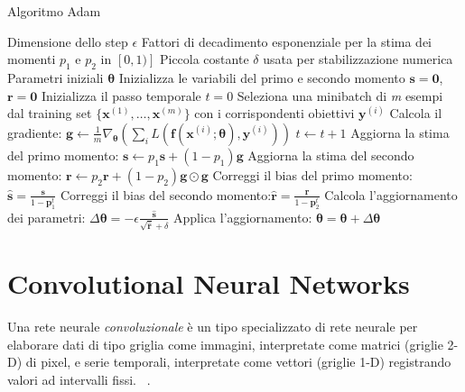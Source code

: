 \documentclass[12pt,a4paper]{report}
\begin{document}
    \begin{algorithm}[t]
        \caption{Algoritmo Adam}
        \begin{algorithmic} \label{alg:adam}
        \REQUIRE Dimensione dello step $\epsilon$
        \REQUIRE Fattori di decadimento esponenziale per la stima dei 
            momenti $p_1$ e $p_2$ in $[0,1)]$
        \REQUIRE Piccola costante $\delta$ usata per stabilizzazione 
            numerica
        \REQUIRE Parametri iniziali $\boldsymbol{\theta}$
        \STATE Inizializza le variabili del primo e secondo momento 
            $\boldsymbol{s}=\boldsymbol{0}$, 
            $\boldsymbol{r}=\boldsymbol{0}$
        \STATE Inizializza il passo temporale $t=0$
        \STATE Seleziona una minibatch di \textit{m} esempi dal training
            set $\{\boldsymbol{x}^{(1)}, \dots, \boldsymbol{x}^{(m)}\}$ 
            con i corrispondenti obiettivi $\boldsymbol{y}^{(i)}$
        \STATE Calcola il gradiente: $\boldsymbol{g}\leftarrow 
            \frac{1}{m}\nabla_{\boldsymbol{\theta}}(\sum_{i} 
            L(\boldsymbol{f}(\boldsymbol{x}^{(i)}; 
            \boldsymbol{\theta}), \boldsymbol{y}^{(i)}))$
        \STATE $t\leftarrow t+1$
        \STATE Aggiorna la stima del primo momento: $\boldsymbol{s}
            \leftarrow p_1\boldsymbol{s}+(1-p_1)\boldsymbol{g}$
        \STATE Aggiorna la stima del secondo momento: $\boldsymbol{r}
            \leftarrow p_2\boldsymbol{r}+(1-p_2)\boldsymbol{g}\odot
            \boldsymbol{g}$
        \STATE Correggi il bias del primo momento: $\boldsymbol{\hat{s}}=
            \frac{\boldsymbol{s}}{1-\boldsymbol{p}_1^t}$
        \STATE Correggi il bias del secondo momento:$\boldsymbol{\hat{r}}
            =\frac{\boldsymbol{r}}{1-\boldsymbol{p}_2^t}$
        \STATE Calcola l'aggiornamento dei parametri: 
            $\Delta\boldsymbol{\theta}=-\epsilon\frac
            {\boldsymbol{\hat{s}}}
            {\sqrt{\boldsymbol{\hat{r}}}+\delta}$
        \STATE Applica l'aggiornamento: $\boldsymbol{\theta}=
            \boldsymbol{\theta}+\Delta\boldsymbol{\theta}$
        \ENDWHILE
        \end{algorithmic}
    \end{algorithm}
    
    \newpage
    \section{Convolutional Neural Networks}
    Una rete neurale \textit{convoluzionale} \`e un tipo
    specializzato di rete neurale per elaborare dati di tipo 
    griglia come immagini, interpretate come matrici (griglie 2-D) 
    di pixel, e serie temporali, interpretate come vettori (griglie
    1-D) registrando valori ad intervalli fissi. 
    ~\cite{doi:10.1162/neco.1989.1.4.541}.
\end{document}
